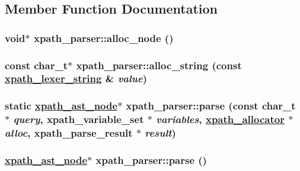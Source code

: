 \subsection{Member Function Documentation}
\hypertarget{structxpath__parser_e33adcc8eb125124967d95297daff351}{
\subsubsection[alloc\_\-node]{\setlength{\rightskip}{0pt plus 5cm}void$\ast$ xpath\_\-parser::alloc\_\-node ()}}
\label{structxpath__parser_e33adcc8eb125124967d95297daff351}


\hypertarget{structxpath__parser_109e4c472bb76911a2b49ee741d400af}{
\subsubsection[alloc\_\-string]{\setlength{\rightskip}{0pt plus 5cm}const char\_\-t$\ast$ xpath\_\-parser::alloc\_\-string (const \hyperlink{structxpath__lexer__string}{xpath\_\-lexer\_\-string} \& {\em value})}}
\label{structxpath__parser_109e4c472bb76911a2b49ee741d400af}


\hypertarget{structxpath__parser_b865a9a777b466365b3c4bd50290189d}{
\subsubsection[parse]{\setlength{\rightskip}{0pt plus 5cm}static \hyperlink{classxpath__ast__node}{xpath\_\-ast\_\-node}$\ast$ xpath\_\-parser::parse (const char\_\-t $\ast$ {\em query}, xpath\_\-variable\_\-set $\ast$ {\em variables}, \hyperlink{classxpath__allocator}{xpath\_\-allocator} $\ast$ {\em alloc}, xpath\_\-parse\_\-result $\ast$ {\em result})}}
\label{structxpath__parser_b865a9a777b466365b3c4bd50290189d}


\hypertarget{structxpath__parser_581e576958037e1ab682fb952b3ada38}{
\subsubsection[parse]{\setlength{\rightskip}{0pt plus 5cm}\hyperlink{classxpath__ast__node}{xpath\_\-ast\_\-node}$\ast$ xpath\_\-parser::parse ()}}
\label{structxpath__parser_581e576958037e1ab682fb952b3ada38}


